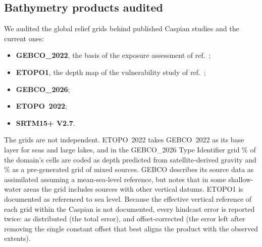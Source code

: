 \subsection*{Bathymetry products audited}
We audited the global relief grids behind published Caspian studies and the current ones:
\begin{itemize}
  \item \textbf{GEBCO\_2022}\citep{gebco2022}, the basis of the exposure assessment of ref.~;
  \item \textbf{ETOPO1}\citep{amante2009}, the depth map of the vulnerability study of ref.~;
  \item \textbf{GEBCO\_2026}\citep{gebco2026};
  \item \textbf{ETOPO~2022}\citep{etopo2022,macferrin2025};
  \item \textbf{SRTM15+ V2.7}\citep{tozer2019}.
\end{itemize}
The grids are not independent. ETOPO~2022 takes GEBCO~2022 as its base layer for seas and large lakes\citep{macferrin2025}, and in the GEBCO\_2026 Type Identifier grid \% of the domain's cells are coded as depth predicted from satellite-derived gravity and \% as a pre-generated grid of mixed sources\citep{gebco2026}. GEBCO describes its source data as assimilated assuming a mean-sea-level reference, but notes that in some shallow-water areas the grid includes sources with other vertical datums\citep{gebco2026}. ETOPO1 is documented as referenced to sea level\citep{amante2009}. Because the effective vertical reference of each grid within the Caspian is not documented, every hindcast error is reported twice: as distributed (the total error), and offset-corrected (the error left after removing the single constant offset that best aligns the product with the observed extents).
